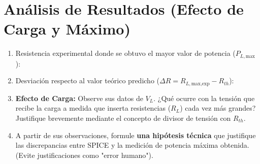 \documentclass[11pt, a4paper]{article}
\begin{document}
\section*{Análisis de Resultados (Efecto de Carga y Máximo)}
\begin{enumerate}
    \item Resistencia experimental donde se obtuvo el mayor valor de potencia ($P_{L,\text{max}}$): 
    \par\vspace{0.2cm}\noindent\hrulefill
    
    \item Desviación respecto al valor teórico predicho ($\Delta R = R_{L,\text{max,exp}} - R_{th}$): 
    \par\vspace{0.2cm}\noindent\hrulefill
    
    \item \textbf{Efecto de Carga:} Observe sus datos de $V_L$. ¿Qué ocurre con la tensión que recibe la carga a medida que inserta resistencias ($R_L$) cada vez más grandes? Justifique brevemente mediante el concepto de divisor de tensión con $R_{th}$.
    \vspace{2cm}
    
    \item A partir de sus observaciones, formule \textbf{una hipótesis técnica} que justifique las discrepancias entre SPICE y la medición de potencia máxima obtenida. (Evite justificaciones como "error humano").
    \vspace{2cm}
\end{enumerate}
\end{document}
